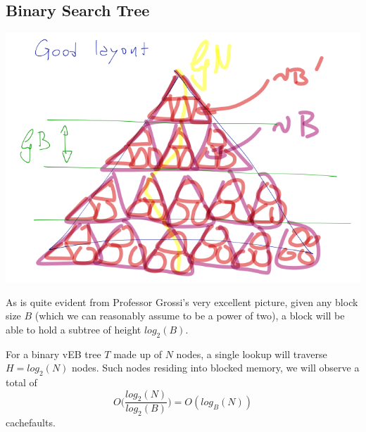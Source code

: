 \documentclass[a4paper]{article}
\begin{document}
\subsection*{Binary Search Tree}
\includegraphics[scale = 0.65]{pic}

As is quite evident from Professor Grossi's very excellent picture, given any block size $B$ (which we can reasonably assume to be a power of two), a block will be able to hold a subtree of height $log_2(B)$.

For a binary vEB tree $T$ made up of $N$ nodes, a single lookup will traverse $H = log_2(N)$ nodes. Such nodes residing into blocked memory, we will observe a total of $$O\bigg(\frac{log_2(N)}{log_2(B)}\bigg) = O(log_B(N))$$ cachefaults.
\end{document}
